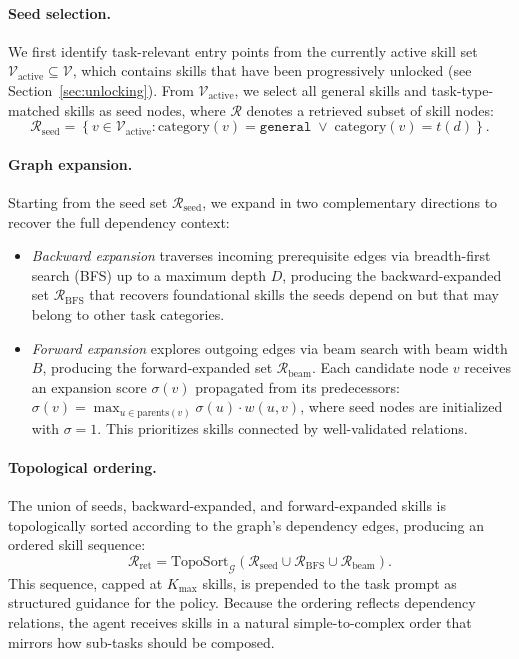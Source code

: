 \paragraph{Seed selection.}
We first identify task-relevant entry points from the currently active skill set $\mathcal{V}_{\text{active}} \subseteq \mathcal{V}$, which contains skills that have been progressively unlocked (see Section~\ref{sec:unlocking}). From $\mathcal{V}_{\text{active}}$, we select all general skills and task-type-matched skills as seed nodes, where $\mathcal{R}$ denotes a retrieved subset of skill nodes:
\begin{equation}
    \mathcal{R}_{\text{seed}} = \left\{ v \in \mathcal{V}_{\text{active}} : \mathrm{category}(v)=\texttt{general} \;\vee\; \mathrm{category}(v)=t(d) \right\}.
    \label{eq:seed_selection}
\end{equation}

\paragraph{Graph expansion.}
Starting from the seed set $\mathcal{R}_{\text{seed}}$, we expand in two complementary directions to recover the full dependency context:
\begin{itemize}[leftmargin=*, nosep]
    \item \emph{Backward expansion} traverses incoming prerequisite edges via breadth-first search (BFS) up to a maximum depth $D$, producing the backward-expanded set $\mathcal{R}_{\text{BFS}}$ that recovers foundational skills the seeds depend on but that may belong to other task categories.
    \item \emph{Forward expansion} explores outgoing edges via beam search with beam width $B$, producing the forward-expanded set $\mathcal{R}_{\text{beam}}$. Each candidate node $v$ receives an expansion score $\sigma(v)$ propagated from its predecessors: $\sigma(v) = \max_{u \in \text{parents}(v)} \sigma(u) \cdot w(u,v)$, where seed nodes are initialized with $\sigma = 1$. This prioritizes skills connected by well-validated relations.
\end{itemize}

\paragraph{Topological ordering.}
The union of seeds, backward-expanded, and forward-expanded skills is topologically sorted according to the graph's dependency edges, producing an ordered skill sequence:
\begin{equation}
    \mathcal{R}_{\text{ret}} = \text{TopoSort}_{\mathcal{G}}\!\left(\mathcal{R}_{\text{seed}} \cup \mathcal{R}_{\text{BFS}} \cup \mathcal{R}_{\text{beam}}\right).
    \label{eq:topo_sort}
\end{equation}
This sequence, capped at $K_{\max}$ skills, is prepended to the task prompt as structured guidance for the policy. Because the ordering reflects dependency relations, the agent receives skills in a natural simple-to-complex order that mirrors how sub-tasks should be composed.

